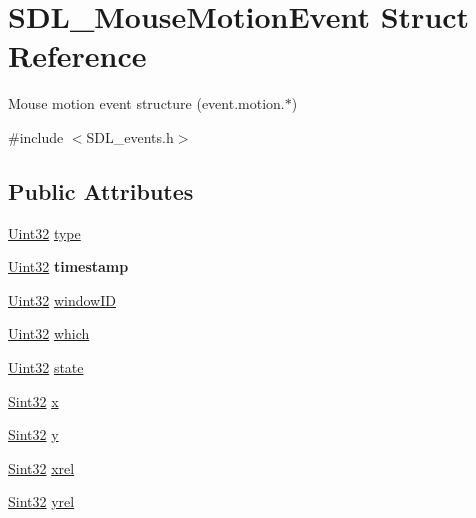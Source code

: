 \hypertarget{struct_s_d_l___mouse_motion_event}{}\section{S\+D\+L\+\_\+\+Mouse\+Motion\+Event Struct Reference}
\label{struct_s_d_l___mouse_motion_event}


Mouse motion event structure (event.\+motion.$\ast$)  




{\ttfamily \#include $<$S\+D\+L\+\_\+events.\+h$>$}

\subsection*{Public Attributes}
\begin{DoxyCompactItemize}
\item 
\hyperlink{_s_d_l__stdinc_8h_add440eff171ea5f55cb00c4a9ab8672d}{Uint32} \hyperlink{struct_s_d_l___mouse_motion_event_a431dd28cd6db6a7335cf633dbeb80cfb}{type}
\item 
\mbox{\label{struct_s_d_l___mouse_motion_event_af530bc0ef327ea6d497c5b1da119841c}} 
\hyperlink{_s_d_l__stdinc_8h_add440eff171ea5f55cb00c4a9ab8672d}{Uint32} {\bfseries timestamp}
\item 
\hyperlink{_s_d_l__stdinc_8h_add440eff171ea5f55cb00c4a9ab8672d}{Uint32} \hyperlink{struct_s_d_l___mouse_motion_event_aa9976725242ada93a9e18e7fdf5796e6}{window\+ID}
\item 
\hyperlink{_s_d_l__stdinc_8h_add440eff171ea5f55cb00c4a9ab8672d}{Uint32} \hyperlink{struct_s_d_l___mouse_motion_event_a6f04c17b4305683915e2fd2dc3c36dbc}{which}
\item 
\hyperlink{_s_d_l__stdinc_8h_add440eff171ea5f55cb00c4a9ab8672d}{Uint32} \hyperlink{struct_s_d_l___mouse_motion_event_a3f6e9bad9d959b824881ba09e05b7024}{state}
\item 
\hyperlink{_s_d_l__stdinc_8h_a7a90b941db9d4582e9ad7abb9940ff7e}{Sint32} \hyperlink{struct_s_d_l___mouse_motion_event_a36398bb4a5308446a262b0bfc8baa80a}{x}
\item 
\hyperlink{_s_d_l__stdinc_8h_a7a90b941db9d4582e9ad7abb9940ff7e}{Sint32} \hyperlink{struct_s_d_l___mouse_motion_event_a7e6a7b1f8713d1968dc913908e8ea448}{y}
\item 
\hyperlink{_s_d_l__stdinc_8h_a7a90b941db9d4582e9ad7abb9940ff7e}{Sint32} \hyperlink{struct_s_d_l___mouse_motion_event_a1c01d9aba2a20778fb45a15dca39ef58}{xrel}
\item 
\hyperlink{_s_d_l__stdinc_8h_a7a90b941db9d4582e9ad7abb9940ff7e}{Sint32} \hyperlink{struct_s_d_l___mouse_motion_event_a7674c8b92d039ab948f671a180fa7b30}{yrel}
\end{DoxyCompactItemize}


